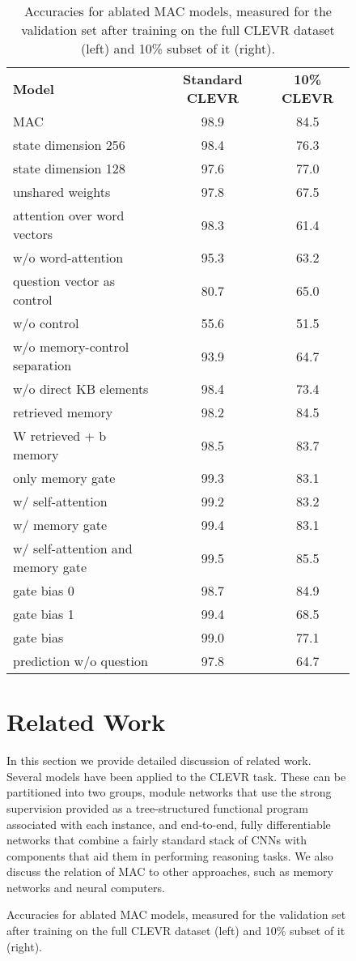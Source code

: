\documentclass[fleqn]{article}
\begin{document}
\begin{figure}[t]
\begin{minipage}{0.55\textwidth}
\begin{table}
\caption{Accuracies for ablated MAC models, measured for the validation set after training on the full CLEVR dataset (left) and 10\% subset of it (right).}
\label{tab:table2}
\centering
\scriptsize
\begin{tabular}{lcc}
\rowcolor{Blue1}
\textbf{Model} & \textbf{Standard CLEVR} & \textbf{10\% CLEVR} \\
MAC & 98.9 & 84.5  \\
\rowcolor{Blue2}
state dimension 256 & 98.4 & 76.3  \\
\rowcolor{Blue2}
state dimension 128 & 97.6 & 77.0  \\
unshared weights & 97.8 & 67.5  \\
\rowcolor{Blue2}
attention over word vectors  & 98.3 & 61.4  \\
\rowcolor{Blue2}
w/o word-attention & 95.3 & 63.2  \\
\rowcolor{Blue2}
question vector as control & 80.7 & 65.0  \\
\rowcolor{Blue2}
w/o control & 55.6 & 51.5  \\
w/o memory-control separation  & 93.9 & 64.7  \\
w/o direct KB elements  & 98.4 & 73.4  \\
\rowcolor{Blue2}
retrieved  memory & 98.2 & 84.5  \\
\rowcolor{Blue2}
W  retrieved + b  memory &  98.5 &  83.7 \\
\rowcolor{Blue2}
only memory gate & 99.3 & 83.1  \\
w/ self-attention & 99.2 & 83.2   \\
w/ memory gate & 99.4 & 83.1  \\
w/ self-attention and memory gate & 99.5 & 85.5  \\
\rowcolor{Blue2}
gate bias 0 & 98.7 & 84.9  \\
\rowcolor{Blue2}
gate bias 1 & 99.4 & 68.5  \\
\rowcolor{Blue2}
gate bias  & 99.0 & 77.1  \\
prediction w/o question & 97.8 & 64.7
\end{tabular}
\end{table}

\section{Related Work}
\label{sec:related}

In this section we provide detailed discussion of related work. Several models have been applied
to the CLEVR task. These can be partitioned into two groups, module networks that use the strong
supervision provided as a tree-structured functional program associated with each instance, and
end-to-end, fully differentiable networks that combine a fairly standard stack of CNNs with components
that aid them in performing reasoning tasks. We also discuss the relation of MAC to other
approaches, such as memory networks and neural computers.


\end{minipage}
\end{figure}
\end{document}
